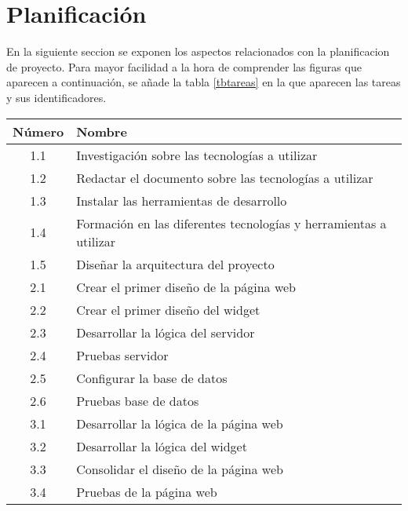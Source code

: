 \section{Planificación}
En la siguiente seccion se exponen los aspectos relacionados con la planificacion de proyecto. Para mayor facilidad a la hora de comprender las figuras que aparecen a continuación, se añade la tabla \ref{tbtareas} en la que aparecen las tareas y sus identificadores.
\begin{table}[]
	\centering
	\begin{tabular}{|c|l|}
		\hline
		Número & Nombre                                                            \\ \hline
		1.1    & Investigación sobre las tecnologías a utilizar                    \\ \hline
		1.2    & Redactar el documento sobre las tecnologías a utilizar            \\ \hline
		1.3    & Instalar las herramientas de desarrollo                           \\ \hline
		1.4    & Formación en las diferentes tecnologías y herramientas a utilizar \\ \hline
		1.5    & Diseñar la arquitectura del proyecto                              \\ \hline
		2.1    & Crear el primer diseño de la página web                           \\ \hline
		2.2    & Crear el primer diseño del widget                                 \\ \hline
		2.3    & Desarrollar la lógica del servidor                                \\ \hline
		2.4    & Pruebas servidor                                                  \\ \hline
		2.5    & Configurar la base de datos                                       \\ \hline
		2.6    & Pruebas base de datos                                             \\ \hline
		3.1    & Desarrollar la lógica de la página web                            \\ \hline
		3.2    & Desarrollar la lógica del widget                                  \\ \hline
		3.3    & Consolidar el diseño de la página web                             \\ \hline
		3.4    & Pruebas de la página web                                          \\ \hline

\end{tabular}
\end{table}
